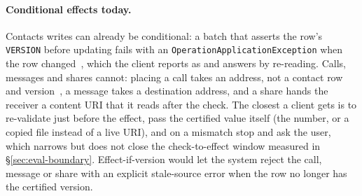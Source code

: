\paragraph{Conditional effects today.} Contacts writes can already be conditional: a batch that asserts the row's \texttt{VERSION} before updating fails with an \texttt{OperationApplicationException} when the row changed~\cite{android_cpo,android_rawcontacts}, which the client reports as \Unknown and answers by re-reading. Calls, messages and shares cannot: placing a call takes an address, not a contact row and version~\cite{android_telecom}, a message takes a destination address, and a share hands the receiver a content URI that it reads after the check. The closest a client gets is to re-validate just before the effect, pass the certified value itself (the number, or a copied file instead of a live URI), and on a mismatch stop and ask the user, which narrows but does not close the check-to-effect window measured in \S\ref{sec:eval-boundary}. Effect-if-version would let the system reject the call, message or share with an explicit stale-source error when the row no longer has the certified version.
